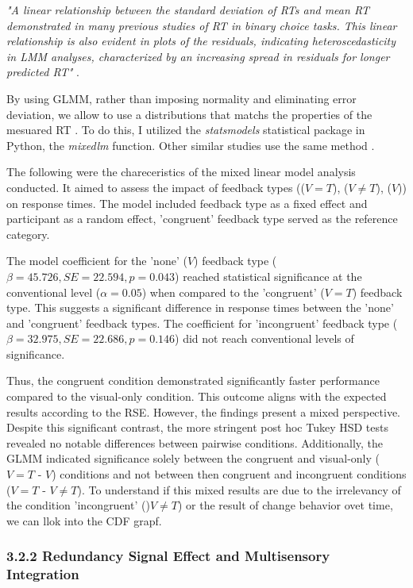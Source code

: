 \documentclass[12pt,oneside,openright]{report}
\begin{document}
\textit{"A linear relationship between the standard deviation of RTs and mean RT demonstrated in many previous studies of RT in binary choice tasks. This linear relationship is also evident in plots of the residuals, indicating heteroscedasticity in LMM analyses, characterized by an increasing spread in residuals for longer predicted RT"} \parencite{Lo2015-fv}.

By using GLMM, rather than imposing normality and eliminating error deviation, we allow to use a distributions that matchs the properties of the mesuared RT \parencite{Lo2015-fv}. To do this, I utilized the \textit{statsmodels} statistical package in Python, the \textit{mixedlm} function. Other similar studies use the same method \parencite{RSE_FBI}.

The following were the chareceristics of the mixed linear model analysis conducted. It aimed to assess the impact of feedback types (($V=T$), ($V \neq T$), ($V$)) on response times. The model included feedback type as a fixed effect and participant as a random effect, 'congruent' feedback type served as the reference category.

The model coefficient for the 'none' ($V$) feedback type ($\beta = 45.726, SE = 22.594, p = 0.043$) reached statistical significance at the conventional level ($\alpha =0.05 $) when compared to the 'congruent' ($V=T$) feedback type. This suggests a significant difference in response times between the 'none' and 'congruent' feedback types. The coefficient for 'incongruent' feedback type ($\beta = 32.975, SE = 22.686, p = 0.146$) did not reach conventional levels of significance. 

Thus, the congruent condition demonstrated significantly faster performance compared to the visual-only condition. This outcome aligns with the expected results according to the RSE. However, the findings present a mixed perspective. Despite this significant contrast, the more stringent post hoc Tukey HSD tests revealed no notable differences between pairwise conditions. Additionally, the GLMM indicated significance solely between the congruent and visual-only ($V=T$ - $V$) conditions and not between then congruent and incongruent conditions ($V=T$ - $V \neq T$). To understand if this mixed results are due to the irrelevancy of the condition 'incongruent' ()$V \neq T$) or the result of change behavior ovet time, we can llok into the CDF grapf. 

\subsubsection*{3.2.2 Redundancy Signal Effect and Multisensory Integration}
\end{document}
